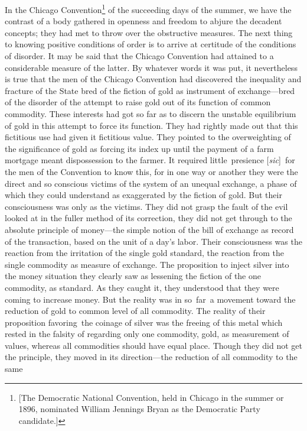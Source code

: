 \documentclass[twoside,symmetric,nobib,justified]{tufte-book}
\begin{document}
In the Chicago Convention\footnote{{[}The Democratic National
  Convention, held in Chicago in the summer or 1896, nominated William
  Jennings Bryan as the Democratic Party candidate.{]}} of the
succeeding days of the summer, we have the contrast of a body gathered
in openness and freedom to abjure the decadent concepts; they had met to
throw over the obstructive measures. The next thing to knowing positive
conditions of order is to arrive at certitude of the conditions of
disorder. It may be said that the Chicago Convention had attained to a
considerable measure of the latter. By whatever words it was put, it
nevertheless is true that the men of the Chicago Convention had
discovered the inequality and fracture of the State bred of the fiction
of gold as instrument of exchange---bred of the disorder of the attempt
to raise gold out of its function of common commodity. These interests
had got so far as to discern the unstable equilibrium of gold in this
attempt to force its function. They had rightly made out that this
fictitious use had given it fictitious value. They pointed to the
overweighting of the significance of gold as forcing its index up until
the payment of a farm mortgage meant dispossession to the farmer. It
required little~presience {[}\emph{sic}{]}~for the men of the Convention
to know this, for in one way or another they were the direct and so
conscious victims of the system of an unequal exchange, a phase of which
they could understand as exaggerated by the fiction of gold. But their
consciousness was only as the victims. They did not grasp the fault of
the evil looked at in the fuller method of its correction, they did not
get through to the absolute principle of money---the simple notion of
the bill of exchange as record of the transaction, based on the unit of
a day's labor. Their consciousness was the reaction from the irritation
of the single gold standard, the reaction from the single commodity as
measure of exchange. The proposition to inject silver into the money
situation they clearly saw as lessening the fiction of the one
commodity, as standard. As they caught it, they understood that they
were coming to increase money. But the reality was in so~far~a movement
toward the reduction of gold to common level of all commodity. The
reality of their proposition favoring~the coinage of silver was the
freeing of this metal which rested in the falsity of regarding only one
commodity, gold, as measurement of values, whereas all commodities
should have equal place. Though they did not get the principle, they
moved in its direction---the reduction of all commodity to the same
\end{document}
